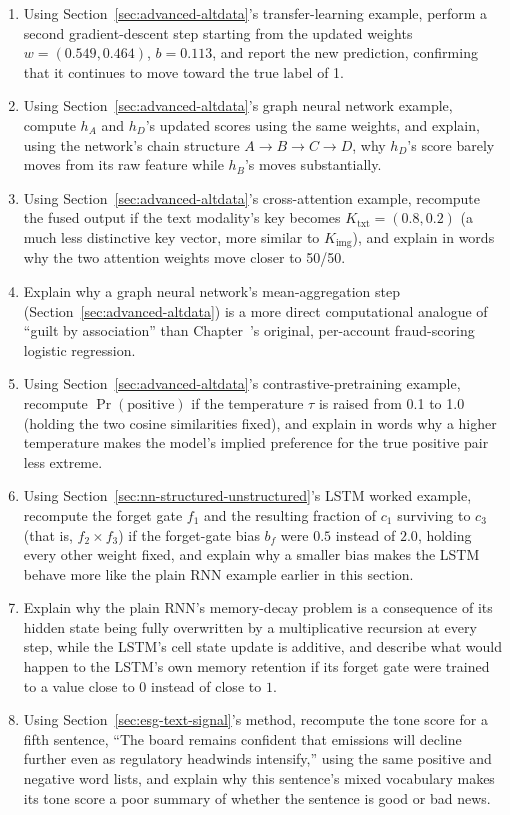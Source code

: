\documentclass[../ai_in_finance]{subfiles}
\begin{document}
\begin{enumerate}[exercises]
    \item Using Section~\ref{sec:advanced-altdata}'s transfer-learning example, perform a second gradient-descent step starting from the updated weights $w=(0.549,0.464)$, $b=0.113$, and report the new prediction, confirming that it continues to move toward the true label of 1.
    \item Using Section~\ref{sec:advanced-altdata}'s graph neural network example, compute $h_A$ and $h_D$'s updated scores using the same weights, and explain, using the network's chain structure $A \to B \to C \to D$, why $h_D$'s score barely moves from its raw feature while $h_B$'s moves substantially.
    \item Using Section~\ref{sec:advanced-altdata}'s cross-attention example, recompute the fused output if the text modality's key becomes $K_{\text{txt}} = (0.8, 0.2)$ (a much less distinctive key vector, more similar to $K_{\text{img}}$), and explain in words why the two attention weights move closer to 50/50.
    \item Explain why a graph neural network's mean-aggregation step (Section~\ref{sec:advanced-altdata}) is a more direct computational analogue of ``guilt by association'' than Chapter~'s original, per-account fraud-scoring logistic regression.
    \item Using Section~\ref{sec:advanced-altdata}'s contrastive-pretraining example, recompute $\Pr(\text{positive})$ if the temperature $\tau$ is raised from 0.1 to 1.0 (holding the two cosine similarities fixed), and explain in words why a higher temperature makes the model's implied preference for the true positive pair less extreme.
    \item Using Section~\ref{sec:nn-structured-unstructured}'s LSTM worked example, recompute the forget gate $f_1$ and the resulting fraction of $c_1$ surviving to $c_3$ (that is, $f_2\times f_3$) if the forget-gate bias $b_f$ were $0.5$ instead of $2.0$, holding every other weight fixed, and explain why a smaller bias makes the LSTM behave more like the plain RNN example earlier in this section.
    \item Explain why the plain RNN's memory-decay problem is a consequence of its hidden state being fully overwritten by a multiplicative recursion at every step, while the LSTM's cell state update is additive, and describe what would happen to the LSTM's own memory retention if its forget gate were trained to a value close to $0$ instead of close to $1$.
    \item Using Section~\ref{sec:esg-text-signal}'s method, recompute the tone score for a fifth sentence, ``The board remains confident that emissions will decline further even as regulatory headwinds intensify,'' using the same positive and negative word lists, and explain why this sentence's mixed vocabulary makes its tone score a poor summary of whether the sentence is good or bad news.

\end{enumerate}
\end{document}
